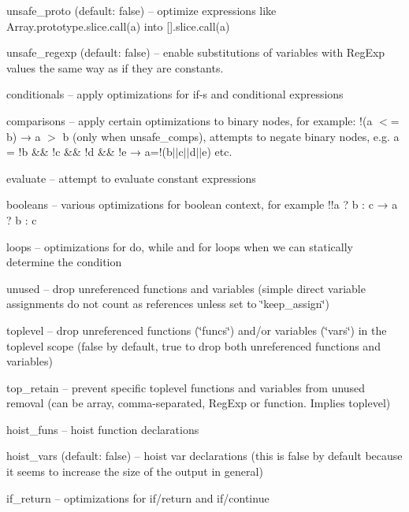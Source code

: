 \begin{DoxyItemize}
\item {\ttfamily unsafe\+\_\+proto} (default\+: false) -- optimize expressions like {\ttfamily Array.\+prototype.\+slice.\+call(a)} into {\ttfamily \mbox{[}\mbox{]}.slice.\+call(a)}
\item {\ttfamily unsafe\+\_\+regexp} (default\+: false) -- enable substitutions of variables with {\ttfamily Reg\+Exp} values the same way as if they are constants.
\item {\ttfamily conditionals} -- apply optimizations for {\ttfamily if}-\/s and conditional expressions
\item {\ttfamily comparisons} -- apply certain optimizations to binary nodes, for example\+: {\ttfamily !(a $<$= b) → a $>$ b} (only when {\ttfamily unsafe\+\_\+comps}), attempts to negate binary nodes, e.\+g. {\ttfamily a = !b \&\& !c \&\& !d \&\& !e → a=!(b$\vert$$\vert$c$\vert$$\vert$d$\vert$$\vert$e)} etc.
\item {\ttfamily evaluate} -- attempt to evaluate constant expressions
\item {\ttfamily booleans} -- various optimizations for boolean context, for example {\ttfamily !!a ? b \+: c → a ? b \+: c}
\item {\ttfamily loops} -- optimizations for {\ttfamily do}, {\ttfamily while} and {\ttfamily for} loops when we can statically determine the condition
\item {\ttfamily unused} -- drop unreferenced functions and variables (simple direct variable assignments do not count as references unless set to {\ttfamily \char`\"{}keep\+\_\+assign\char`\"{}})
\item {\ttfamily toplevel} -- drop unreferenced functions ({\ttfamily \char`\"{}funcs\char`\"{}}) and/or variables ({\ttfamily \char`\"{}vars\char`\"{}}) in the toplevel scope ({\ttfamily false} by default, {\ttfamily true} to drop both unreferenced functions and variables)
\item {\ttfamily top\+\_\+retain} -- prevent specific toplevel functions and variables from {\ttfamily unused} removal (can be array, comma-\/separated, Reg\+Exp or function. Implies {\ttfamily toplevel})
\item {\ttfamily hoist\+\_\+funs} -- hoist function declarations
\item {\ttfamily hoist\+\_\+vars} (default\+: false) -- hoist {\ttfamily var} declarations (this is {\ttfamily false} by default because it seems to increase the size of the output in general)
\item {\ttfamily if\+\_\+return} -- optimizations for if/return and if/continue

\end{DoxyItemize}
